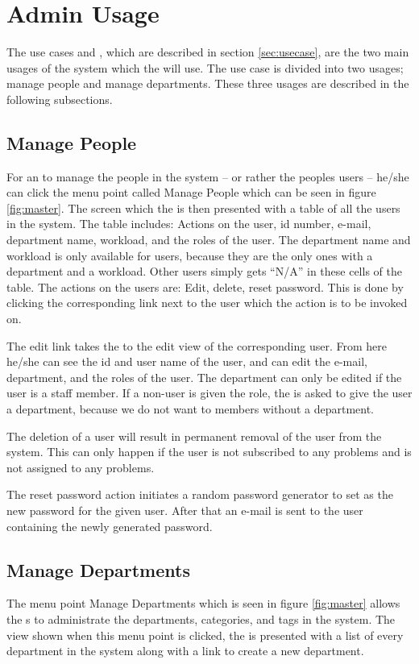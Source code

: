 \section{Admin Usage}
\label{sec:admin_usage}
The use cases \tucadmin[] and \gstat[], which are described in section \ref{sec:usecase}, are the two main usages of the system which the \admin[] will use.
The \tucadmin[] use case is divided into two usages; manage people and manage departments.
These three usages are described in the following subsections.

\subsection{Manage People}
\label{sub:managePeople}
For an \admin[] to manage the people in the system -- or rather the peoples users -- he/she can click the menu point called Manage People which can be seen in figure \ref{fig:master}.
The screen which the \admin[] is then presented with a table of all the users in the system.
The table includes: Actions on the user, id number, e-mail, department name, workload, and the roles of the user.
The department name and workload is only available for \astaff[] users, because they are the only ones with a department and a workload.
Other users simply gets ``N/A'' in these cells of the table.
The actions on the users are: Edit, delete, reset password.
This is done by clicking the corresponding link next to the user which the action is to be invoked on.

The edit link takes the \admin[] to the edit view of the corresponding user.
From here he/she can see the id and user name of the user, and can edit the e-mail, department, and the roles of the user.
The department can only be edited if the user is a staff member.
If a non-\astaff[] user is given the \astaff[] role, the \admin[] is asked to give the user a department, because we do not want to \astaff[] members without a department.

The deletion of a user will result in permanent removal of the user from the system.
This can only happen if the user is not subscribed to any problems and is not assigned to any problems.

The reset password action initiates a random password generator to set as the new password for the given user.
After that an e-mail is sent to the user containing the newly generated password.

\subsection{Manage Departments}
The menu point Manage Departments which is seen in figure \ref{fig:master} allows the \admin[]s to administrate the departments, categories, and tags in the system.
The view shown when this menu point is clicked, the \admin[] is presented with a list of every department in the system along with a link to create a new department.

